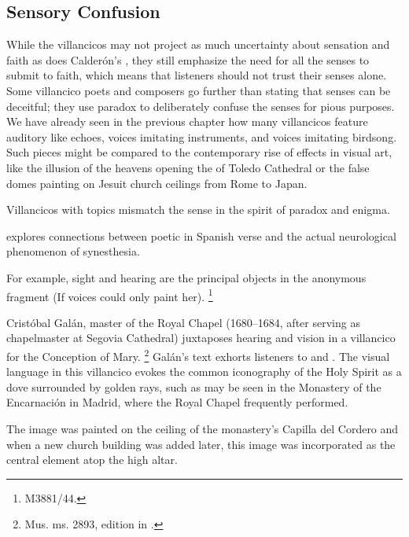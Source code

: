 \subsection{Sensory Confusion}

While the  villancicos may not project as much uncertainty about sensation and faith as does Calderón's , they still emphasize the need for all the senses to submit to faith, which means that listeners should not trust their senses alone.
Some villancico poets and composers go further than stating that senses can be deceitful; they use paradox to deliberately confuse the senses for pious purposes.
We have already seen in the previous chapter how many villancicos feature auditory  like echoes, voices imitating instruments, and voices imitating birdsong.
Such pieces might be compared to the contemporary rise of  effects in visual art, like the illusion of the heavens opening the  of Toledo Cathedral or the false domes painting on Jesuit church ceilings from Rome to Japan.%
\Autocite[\XXX + illusion in Baroque art]{Bailey:Art}

Villancicos with  topics mismatch the sense in the spirit of paradox and enigma.%
\begin{Footnote}
  \Autocite{DoetschKraus:Sinestesia} explores connections between poetic  in Spanish verse and the actual neurological phenomenon of synesthesia.
\end{Footnote}
For example, sight and hearing are the principal objects in the anonymous fragment  (If voices could only paint her).%
\footnote{\signature{E-Mn}{M3881/44}.}

Cristóbal Galán, master of the Royal Chapel (1680--1684, after serving as chapelmaster at Segovia Cathedral) juxtaposes hearing and vision in a villancico for the Conception of Mary.%
\footnote{\signature{D-Mbs}{Mus. ms. 2893}, edition in \autocite[567--568]{CaberoPueyo:PhD}.}
Galán's text exhorts listeners to  and .
The visual language in this villancico evokes the common iconography of the Holy Spirit as a dove surrounded by golden rays, such as may be seen in the Monastery of the Encarnación in Madrid, where the Royal Chapel frequently performed.%
\begin{Footnote}
  The image was painted on the ceiling of the monastery's Capilla del Cordero and when a new church building was added later, this image was incorporated as the central element atop the high altar.%
  \Autocite[69--70, 81]{Sanz:GuiaDescalzasEncarnacion}
\end{Footnote}

